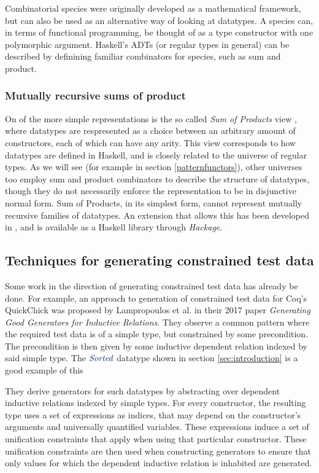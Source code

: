 \documentclass[a4paper,msc,twosized=semi]{uustthesis}
\newcommand*{\mathcolor}{}
\def\mathcolor#1#{\mathcoloraux{#1}}
\newcommand*{\mathcoloraux}[3]{%
  \protect\leavevmode
  \begingroup
    \color#1{#2}#3%
  \endgroup
}
\newcommand{\HSCon}[1]{\mathcolor{hsblue3}{\mathit{#1}}}
\begin{document}
  Combinatorial species \cite{yorgey2010species} were 
  originally developed as a mathematical framework, but can also be used as an 
  alternative way of looking at datatypes. A species can, in terms of functional 
  programming, be thought of as a type constructor with one polymorphic argument. 
  Haskell’s ADTs (or regular types in general) can be described by definining familiar 
  combinators for species, such as sum and product.

\subsubsection{Mutually recursive sums of product}

  On of the more simple representations is the so called \textit{Sum of Products} view 
  \cite{de2014true}, where datatypes are respresented as a choice between an arbitrary 
  amount of constructors, each of which can have any arity. This view corresponds to 
  how datatypes are defined in Haskell, and is closely related to the universe of 
  regular types. As we will see (for example in section \ref{patternfunctors}), other 
  universes too employ sum and product combinators to describe the structure of 
  datatypes, though they do not necessarily enforce the representation to be in 
  disjunctive normal form. Sum of Products, in its simplest form, cannot represent 
  mutually recursive families of datatypes. An extension that allows this has been 
  developed in \cite{miraldo2018sums}, and is available as a Haskell library through 
  \emph{Hackage}.  

\subsection{Techniques for generating constrained test data}

  Some work in the direction of generating constrained test data has already be done. For example, an approach to generation of constrained test data for Coq's QuickChick was proposed by Lampropoulos et al. \cite{lampropoulos2017generating} in their 2017 paper \textit{Generating Good Generators for Inductive Relations}. They observe a common pattern where the required test data is of a simple type, but constrained by some precondition. The precondition is then given by some inductive dependent relation indexed by said simple type. The \ensuremath{\HSCon{Sorted}} datatype shown in section \ref{sec:introduction} is a good example of this

  They derive generators for such datatypes by abstracting over dependent inductive relations indexed by simple types. For every constructor, the resulting type uses a set of expressions as indices, that may depend on the constructor's arguments and universally quantified variables. These expressions induce a set of unification constraints that apply when using that particular constructor. These unification constraints are then used when constructing generators to ensure that only values for which the dependent inductive relation is inhabited are generated. 
\end{document}

